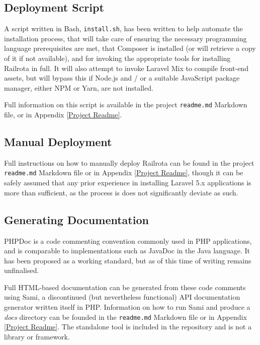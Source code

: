 \subsection{Deployment Script}
A script written in Bash, \texttt{install.sh}, has been written to help automate the installation process, that will take care of ensuring the necessary programming language prerequisites are met, that Composer is installed (or will retrieve a copy of it if not available), and for invoking the appropriate tools for installing Railrota in full. It will also attempt to invoke Laravel Mix to compile front-end assets, but will bypass this if Node.js and / or a suitable JavaScript package manager, either NPM or Yarn, are not installed.

Full information on this script is available in the project \texttt{readme.md} Markdown file, or in Appendix \ref{Project Readme}.

\subsection{Manual Deployment}
Full instructions on how to manually deploy Railrota can be found in the project \texttt{readme.md} Markdown file or in Appendix \ref{Project Readme}, though it can be safely assumed that any prior experience in installing Laravel 5.x applications is more than sufficient, as the process is does not significantly deviate as such.

\subsection{Generating Documentation}
PHPDoc is a code commenting convention commonly used in PHP applications, and is comparable to implementations such as JavaDoc in the Java language. It has been proposed as a working standard, but as of this time of writing remains unfinalised. \cite{PSR2} \cite{Joomla1}

Full HTML-based documentation can be generated from these code comments using Sami, a discontinued (but nevertheless functional) API documentation generator written itself in PHP. Information on how to run Sami and produce a \textit{docs} directory can be founded in the \texttt{readme.md} Markdown file or in Appendix \ref{Project Readme}. The standalone tool is included in the repository and is not a library or framework. \cite{Sami1}